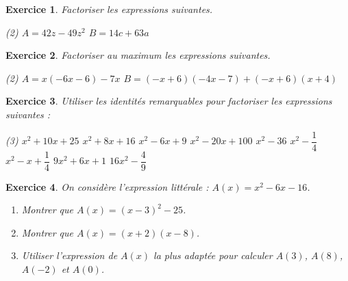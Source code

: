 \documentclass[a4paper,12pt,fleqn]{article}
\newtheorem{exercice}{Exercice}
\begin{document}
\begin{exercice}  
Factoriser les expressions suivantes.
\begin{tasks}(2)
    \task $A = 42z-49z^2$
    \task $B = 14c+63a$
\end{tasks}
\end{exercice}
 
\begin{exercice}  
Factoriser au maximum les expressions suivantes.
\begin{tasks}(2)
    \task $A = x(-6x-6)-7x$
    \task $B = (-x+6)(-4x-7)+(-x+6)(x+4)$
\end{tasks}
\end{exercice}
 
\begin{exercice}
Utiliser les identités remarquables pour factoriser les expressions suivantes :
 
 \begin{tasks}(3)
    \task $x^2+10x+25$
    \task $x^2+8x+16$
    \task $x^2-6x+9$
    \task $x^2-20x+100$
    \task $x^2-36$
    \task $x^2-\dfrac{1}{4}$
    \task $x^2-x+\dfrac{1}{4}$
    \task $9x^2+6x+1$
    \task $16x^2-\dfrac{4}{9}$
 \end{tasks} 
\end{exercice}

\begin{exercice}  
On considère l'expression littérale : $A(x) = x^2-6x-16$.
\begin{enumerate}
    \item Montrer que $A(x) = (x-3)^2-25$.
    \item Montrer que $A(x) = (x+2)(x-8)$.
    \item Utiliser l'expression de $A(x)$ la plus adaptée pour calculer $A(3)$, $A(8)$, $A(-2)$ et $A(0)$.
\end{enumerate}
\end{exercice}
 
\end{document}
